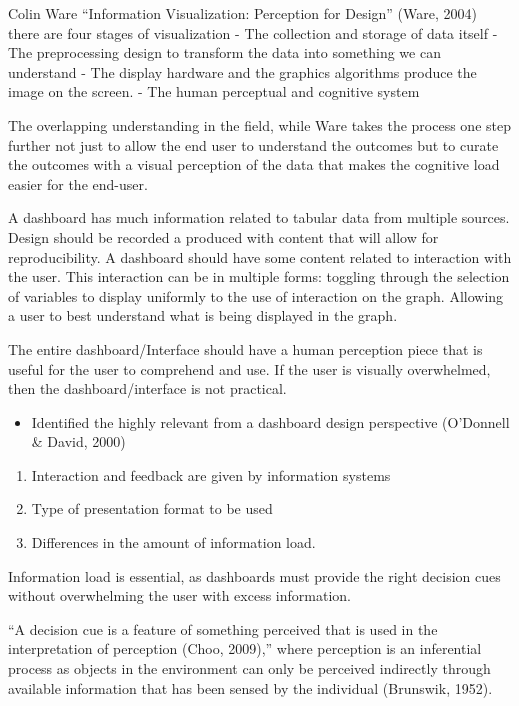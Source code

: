 \documentclass[print]{nuthesis}
\providecommand{\tightlist}{%
  \setlength{\itemsep}{0pt}\setlength{\parskip}{0pt}}
\begin{document}
Colin Ware ``Information Visualization: Perception for Design'' (Ware, 2004) there are four stages of visualization
- The collection and storage of data itself
- The preprocessing design to transform the data into something we can understand
- The display hardware and the graphics algorithms produce the image on the screen.
- The human perceptual and cognitive system

The overlapping understanding in the field, while Ware takes the process one step further not just to allow the end user to understand the outcomes but to curate the outcomes with a visual perception of the data that makes the cognitive load easier for the end-user.

A dashboard has much information related to tabular data from multiple sources. Design should be recorded a produced with content that will allow for reproducibility. A dashboard should have some content related to interaction with the user. This interaction can be in multiple forms: toggling through the selection of variables to display uniformly to the use of interaction on the graph. Allowing a user to best understand what is being displayed in the graph.

The entire dashboard/Interface should have a human perception piece that is useful for the user to comprehend and use. If the user is visually overwhelmed, then the dashboard/interface is not practical.

\begin{itemize}
\tightlist
\item
  Identified the highly relevant from a dashboard design perspective (O'Donnell \& David, 2000)
\end{itemize}

\begin{enumerate}
\def\labelenumi{\arabic{enumi}.}
\tightlist
\item
  Interaction and feedback are given by information systems
\item
  Type of presentation format to be used
\item
  Differences in the amount of information load.
\end{enumerate}

Information load is essential, as dashboards must provide the right decision cues without overwhelming the user with excess information.

``A decision cue is a feature of something perceived that is used in the interpretation of perception (Choo, 2009),'' where perception is an inferential process as objects in the environment can only be perceived indirectly through available information that has been sensed by the individual (Brunswik, 1952).
\end{document}
